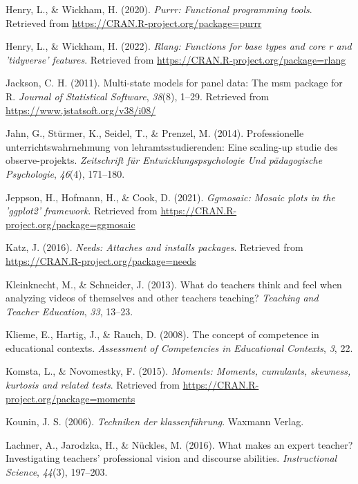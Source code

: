 \documentclass[
  man]{apa6}
\newlength{\cslhangindent}
\newenvironment{CSLReferences}[2] %
 {\begin{list}{}{%
  \setlength{\itemindent}{0pt}
  \setlength{\leftmargin}{0pt}
  \setlength{\parsep}{0pt}
  \ifodd #1
   \setlength{\leftmargin}{\cslhangindent}
   \setlength{\itemindent}{-1\cslhangindent}
  \fi
  \setlength{\itemsep}{#2\baselineskip}}}
 {\end{list}}
\begin{document}
\begin{CSLReferences}{1}{0}
Henry, L., \& Wickham, H. (2020). \emph{Purrr: Functional programming tools}. Retrieved from \url{https://CRAN.R-project.org/package=purrr}

Henry, L., \& Wickham, H. (2022). \emph{Rlang: Functions for base types and core r and 'tidyverse' features}. Retrieved from \url{https://CRAN.R-project.org/package=rlang}

Jackson, C. H. (2011). Multi-state models for panel data: The {msm} package for {R}. \emph{Journal of Statistical Software}, \emph{38}(8), 1--29. Retrieved from \url{https://www.jstatsoft.org/v38/i08/}

Jahn, G., Stürmer, K., Seidel, T., \& Prenzel, M. (2014). Professionelle unterrichtswahrnehmung von lehramtsstudierenden: Eine scaling-up studie des observe-projekts. \emph{Zeitschrift f{ü}r Entwicklungspsychologie Und p{ä}dagogische Psychologie}, \emph{46}(4), 171--180.

Jeppson, H., Hofmann, H., \& Cook, D. (2021). \emph{Ggmosaic: Mosaic plots in the 'ggplot2' framework}. Retrieved from \url{https://CRAN.R-project.org/package=ggmosaic}

Katz, J. (2016). \emph{Needs: Attaches and installs packages}. Retrieved from \url{https://CRAN.R-project.org/package=needs}

Kleinknecht, M., \& Schneider, J. (2013). What do teachers think and feel when analyzing videos of themselves and other teachers teaching? \emph{Teaching and Teacher Education}, \emph{33}, 13--23.

Klieme, E., Hartig, J., \& Rauch, D. (2008). The concept of competence in educational contexts. \emph{Assessment of Competencies in Educational Contexts}, \emph{3}, 22.

Komsta, L., \& Novomestky, F. (2015). \emph{Moments: Moments, cumulants, skewness, kurtosis and related tests}. Retrieved from \url{https://CRAN.R-project.org/package=moments}

Kounin, J. S. (2006). \emph{Techniken der klassenf{ü}hrung}. Waxmann Verlag.

Lachner, A., Jarodzka, H., \& Nückles, M. (2016). What makes an expert teacher? Investigating teachers' professional vision and discourse abilities. \emph{Instructional Science}, \emph{44}(3), 197--203.


\end{CSLReferences}
\end{document}
